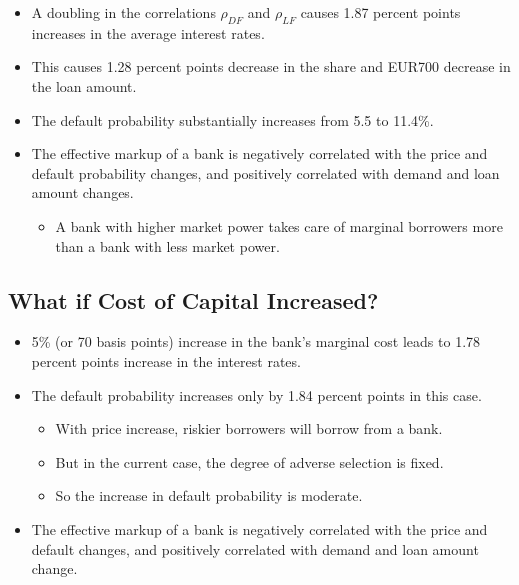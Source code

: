 \documentclass[
]{book}
\providecommand{\tightlist}{%
  \setlength{\itemsep}{0pt}\setlength{\parskip}{0pt}}
\begin{document}
\begin{itemize}
\tightlist
\item
  A doubling in the correlations \(\rho_{DF}\) and \(\rho_{LF}\) causes 1.87 percent points increases in the average interest rates.
\item
  This causes 1.28 percent points decrease in the share and EUR700 decrease in the loan amount.
\item
  The default probability substantially increases from 5.5 to 11.4\%.
\item
  The effective markup of a bank is negatively correlated with the price and default probability changes, and positively correlated with demand and loan amount changes.

  \begin{itemize}
  \tightlist
  \item
    A bank with higher market power takes care of marginal borrowers more than a bank with less market power.
  \end{itemize}
\end{itemize}

\hypertarget{what-if-cost-of-capital-increased}{%
\subsection{What if Cost of Capital Increased?}\label{what-if-cost-of-capital-increased}}

\begin{itemize}
\tightlist
\item
  5\% (or 70 basis points) increase in the bank's marginal cost leads to 1.78 percent points increase in the interest rates.
\item
  The default probability increases only by 1.84 percent points in this case.

  \begin{itemize}
  \tightlist
  \item
    With price increase, riskier borrowers will borrow from a bank.
  \item
    But in the current case, the degree of adverse selection is fixed.
  \item
    So the increase in default probability is moderate.
  \end{itemize}
\item
  The effective markup of a bank is negatively correlated with the price and default changes, and positively correlated with demand and loan amount change.
\end{itemize}
\end{document}
